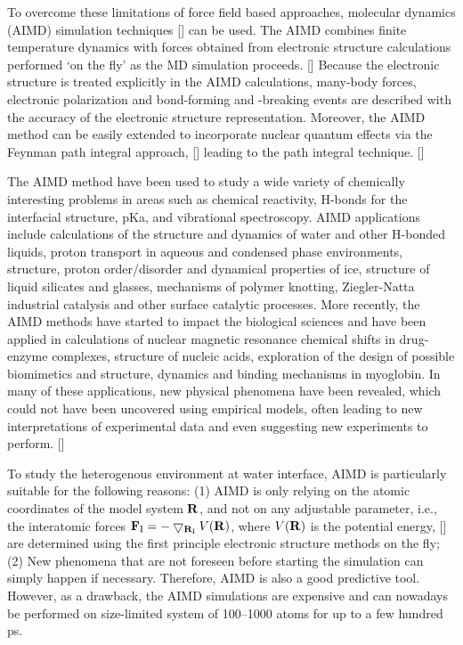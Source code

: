To overcome these limitations of force field based approaches, \abinitio molecular dynamics (AIMD) simulation techniques [\cite{DKR90,MCP92,Allen1993,MET96,MP97,DM00,RC02}] 
can be used. The AIMD combines finite temperature dynamics with forces
obtained from electronic structure calculations performed ‘on the fly’ as the MD simulation
proceeds. [\cite{DM00}] Because the electronic structure is treated explicitly in the AIMD calculations,
many-body forces, electronic polarization and bond-forming and -breaking events are described
with the accuracy of the electronic structure representation. Moreover, the AIMD
method can be easily extended to incorporate nuclear quantum effects via the Feynman
path integral approach, [\cite{RPF65,RPF72}] leading to the \abinitio path integral technique. [\cite{DM96,MT96,DM99}]

The AIMD method have been used to study a wide variety of chemically
interesting problems in areas such as chemical reactivity, H-bonds for the interfacial structure, pKa,
and vibrational spectroscopy. AIMD applications include calculations of the structure and dynamics of water and other H-bonded liquids, 
proton transport in aqueous and condensed phase environments, structure, proton order/disorder and dynamical properties of ice, structure of
liquid silicates and glasses, mechanisms of polymer knotting, Ziegler-Natta industrial catalysis
and other surface catalytic processes. 
More recently, the AIMD methods have started to impact the
biological sciences and have been applied in calculations of nuclear magnetic resonance chemical shifts in 
drug-enzyme complexes, structure of nucleic acids, exploration of the design of possible
biomimetics and structure, dynamics and binding mechanisms in myoglobin.
In many of these applications, new physical phenomena have been revealed, which could
not have been uncovered using empirical models, often leading to new interpretations of
experimental data and even suggesting new experiments to perform. [\cite{TME02}]

To study the heterogenous environment at water interface, AIMD is particularly suitable for the following reasons:
(1) AIMD is only relying on the atomic coordinates of the model system $\bf R$, and not on any adjustable parameter, 
i.e., the interatomic forces ${\bf F}_{\text{I}}=-\bigtriangledown_{{\bf R}_{\text{I}}}V({\bf R})$, where $V({\bf R})$ is the potential energy, [\cite{VKMP}]
are determined using the first principle electronic structure methods on the fly; 
(2) New phenomena that are not foreseen before starting the simulation can simply happen if necessary.
Therefore, AIMD is also a good predictive tool. 
However, as a drawback, the AIMD simulations are expensive and can nowadays be performed on size-limited system of 100--1000 atoms for up to a few hundred ps. 

